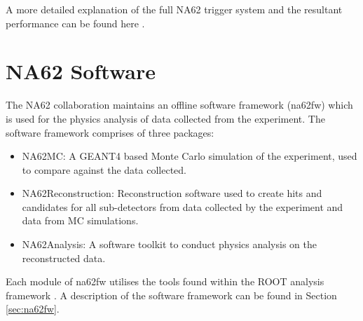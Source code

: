 \documentclass[../../main.tex]{subfiles}
\begin{document}
   
    A more detailed explanation of the full NA62 trigger system and the resultant performance can be found here \cite{NA62_trigger_2023}.
    \section{NA62 Software}\label{sec:introSoft}
    The NA62 collaboration maintains an offline software framework (na62fw) which is used for the physics analysis of data collected from the experiment. The software framework comprises of three packages: 
    \begin{itemize}
        \item NA62MC: A GEANT4 \cite{Agostinelli2003Geant4} based Monte Carlo simulation of the experiment, used to compare against the data collected.
        \item NA62Reconstruction: Reconstruction software used to create hits and candidates for all sub-detectors from data collected by the experiment and data from \gls{MC} simulations.
        \item NA62Analysis: A software toolkit to conduct physics analysis on the reconstructed data.
    \end{itemize}
    Each module of na62fw utilises the tools found within the ROOT analysis framework \cite{Brun1997}. A description of the software framework can be found in Section \ref{sec:na62fw}.
\end{document}
